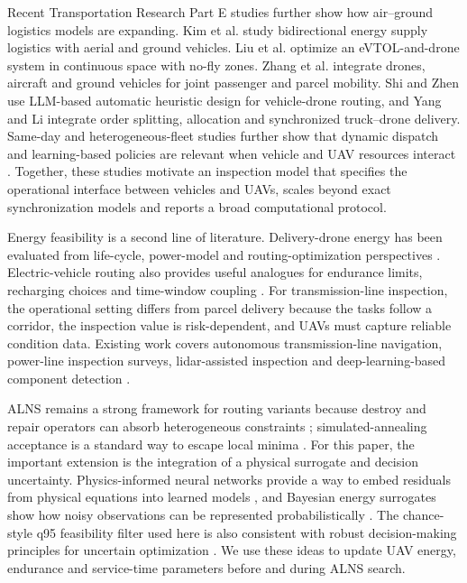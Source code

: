 \documentclass[final,5p,twocolumn,number,nopreprintline]{elsarticle}
\newcommand{\rev}[1]{{\color{blue}#1}}
\begin{document}
Recent Transportation Research Part E studies further show how air--ground logistics models are expanding. Kim et al. \cite{kim2026bidirectional} study bidirectional energy supply logistics with aerial and ground vehicles. Liu et al. \cite{liu2026evtol} optimize an eVTOL-and-drone system in continuous space with no-fly zones. Zhang et al. \cite{zhang2026airground} integrate drones, aircraft and ground vehicles for joint passenger and parcel mobility. Shi and Zhen \cite{shi2026llm} use LLM-based automatic heuristic design for vehicle-drone routing, and Yang and Li \cite{yang2025integrated} integrate order splitting, allocation and synchronized truck--drone delivery. Same-day and heterogeneous-fleet studies further show that dynamic dispatch and learning-based policies are relevant when vehicle and UAV resources interact \cite{ulmer2018sameday,chen2022deepq}. \rev{Together, these studies motivate an inspection model that specifies the operational interface between vehicles and UAVs, scales beyond exact synchronization models and reports a broad computational protocol.}

Energy feasibility is a second line of literature. Delivery-drone energy has been evaluated from life-cycle, power-model and routing-optimization perspectives \cite{stolaroff2018energy,zhang2021energyconsumption,aiello2021energy,chiang2019sustainability,cokyasar2023regional}. Electric-vehicle routing also provides useful analogues for endurance limits, recharging choices and time-window coupling \cite{schneider2014evrptw,desaulniers2016evrp}. For transmission-line inspection, the operational setting differs from parcel delivery because the tasks follow a corridor, the inspection value is risk-dependent, and UAVs must capture reliable condition data. Existing work covers autonomous transmission-line navigation, power-line inspection surveys, lidar-assisted inspection and deep-learning-based component detection \cite{hui2019monocular,ahmed2024powerline,li2021uavtransmission,nguyen2018visionreview,liu2021uavlidar,zhang2020visualinspection,li2025deeppowerline}.

ALNS remains a strong framework for routing variants because destroy and repair operators can absorb heterogeneous constraints \cite{ropke2006alns,sacramento2019alns}; simulated-annealing acceptance is a standard way to escape local minima \cite{kirkpatrick1983annealing}. For this paper, the important extension is the integration of a physical surrogate and decision uncertainty. Physics-informed neural networks provide a way to embed residuals from physical equations into learned models \cite{raissi2019pinn,karniadakis2021piml,lu2021deepxde,cuomo2022pinnreview}, and Bayesian energy surrogates show how noisy observations can be represented probabilistically \cite{yang2021bpinn}. The chance-style q95 feasibility filter used here is also consistent with robust decision-making principles for uncertain optimization \cite{bertsimas2004robustness}. We use these ideas to update UAV energy, endurance and service-time parameters before and during ALNS search.
\end{document}
